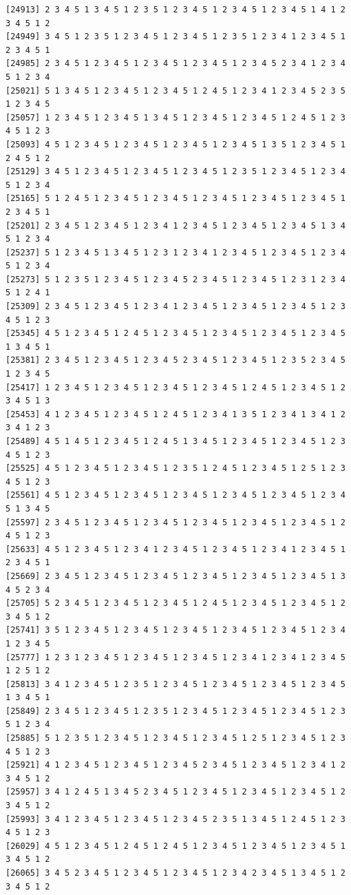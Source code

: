 \documentclass[
  english,
]{book}
\begin{document}
\begin{verbatim}
[24913] 2 3 4 5 1 3 4 5 1 2 3 5 1 2 3 4 5 1 2 3 4 5 1 2 3 4 5 1 4 1 2 3 4 5 1 2
[24949] 3 4 5 1 2 3 5 1 2 3 4 5 1 2 3 4 5 1 2 3 5 1 2 3 4 1 2 3 4 5 1 2 3 4 5 1
[24985] 2 3 4 5 1 2 3 4 5 1 2 3 4 5 1 2 3 4 5 1 2 3 4 5 2 3 4 1 2 3 4 5 1 2 3 4
[25021] 5 1 3 4 5 1 2 3 4 5 1 2 3 4 5 1 2 4 5 1 2 3 4 1 2 3 4 5 2 3 5 1 2 3 4 5
[25057] 1 2 3 4 5 1 2 3 4 5 1 3 4 5 1 2 3 4 5 1 2 3 4 5 1 2 4 5 1 2 3 4 5 1 2 3
[25093] 4 5 1 2 3 4 5 1 2 3 4 5 1 2 3 4 5 1 2 3 4 5 1 3 5 1 2 3 4 5 1 2 4 5 1 2
[25129] 3 4 5 1 2 3 4 5 1 2 3 4 5 1 2 3 4 5 1 2 3 5 1 2 3 4 5 1 2 3 4 5 1 2 3 4
[25165] 5 1 2 4 5 1 2 3 4 5 1 2 3 4 5 1 2 3 4 5 1 2 3 4 5 1 2 3 4 5 1 2 3 4 5 1
[25201] 2 3 4 5 1 2 3 4 5 1 2 3 4 1 2 3 4 5 1 2 3 4 5 1 2 3 4 5 1 3 4 5 1 2 3 4
[25237] 5 1 2 3 4 5 1 3 4 5 1 2 3 1 2 3 4 1 2 3 4 5 1 2 3 4 5 1 2 3 4 5 1 2 3 4
[25273] 5 1 2 3 5 1 2 3 4 5 1 2 3 4 5 2 3 4 5 1 2 3 4 5 1 2 3 1 2 3 4 5 1 2 4 1
[25309] 2 3 4 5 1 2 3 4 5 1 2 3 4 1 2 3 4 5 1 2 3 4 5 1 2 3 4 5 1 2 3 4 5 1 2 3
[25345] 4 5 1 2 3 4 5 1 2 4 5 1 2 3 4 5 1 2 3 4 5 1 2 3 4 5 1 2 3 4 5 1 3 4 5 1
[25381] 2 3 4 5 1 2 3 4 5 1 2 3 4 5 2 3 4 5 1 2 3 4 5 1 2 3 5 2 3 4 5 1 2 3 4 5
[25417] 1 2 3 4 5 1 2 3 4 5 1 2 3 4 5 1 2 3 4 5 1 2 4 5 1 2 3 4 5 1 2 3 4 5 1 3
[25453] 4 1 2 3 4 5 1 2 3 4 5 1 2 4 5 1 2 3 4 1 3 5 1 2 3 4 1 3 4 1 2 3 4 1 2 3
[25489] 4 5 1 4 5 1 2 3 4 5 1 2 4 5 1 3 4 5 1 2 3 4 5 1 2 3 4 5 1 2 3 4 5 1 2 3
[25525] 4 5 1 2 3 4 5 1 2 3 4 5 1 2 3 5 1 2 4 5 1 2 3 4 5 1 2 5 1 2 3 4 5 1 2 3
[25561] 4 5 1 2 3 4 5 1 2 3 4 5 1 2 3 4 5 1 2 3 4 5 1 2 3 4 5 1 2 3 4 5 1 3 4 5
[25597] 2 3 4 5 1 2 3 4 5 1 2 3 4 5 1 2 3 4 5 1 2 3 4 5 1 2 3 4 5 1 2 4 5 1 2 3
[25633] 4 5 1 2 3 4 5 1 2 3 4 1 2 3 4 5 1 2 3 4 5 1 2 3 4 1 2 3 4 5 1 2 3 4 5 1
[25669] 2 3 4 5 1 2 3 4 5 1 2 3 4 5 1 2 3 4 5 1 2 3 4 5 1 2 3 4 5 1 3 4 5 2 3 4
[25705] 5 2 3 4 5 1 2 3 4 5 1 2 3 4 5 1 2 4 5 1 2 3 4 5 1 2 3 4 5 1 2 3 4 5 1 2
[25741] 3 5 1 2 3 4 5 1 2 3 4 5 1 2 3 4 5 1 2 3 4 5 1 2 3 4 5 1 2 3 4 1 2 3 4 5
[25777] 1 2 3 1 2 3 4 5 1 2 3 4 5 1 2 3 4 5 1 2 3 4 1 2 3 4 1 2 3 4 5 1 2 5 1 2
[25813] 3 4 1 2 3 4 5 1 2 3 5 1 2 3 4 5 1 2 3 4 5 1 2 3 4 5 1 2 3 4 5 1 3 4 5 1
[25849] 2 3 4 5 1 2 3 4 5 1 2 3 5 1 2 3 4 5 1 2 3 4 5 1 2 3 4 5 1 2 3 5 1 2 3 4
[25885] 5 1 2 3 5 1 2 3 4 5 1 2 3 4 5 1 2 3 4 5 1 2 5 1 2 3 4 5 1 2 3 4 5 1 2 3
[25921] 4 1 2 3 4 5 1 2 3 4 5 1 2 3 4 5 2 3 4 5 1 2 3 4 5 1 2 3 4 1 2 3 4 5 1 2
[25957] 3 4 1 2 4 5 1 3 4 5 2 3 4 5 1 2 3 4 5 1 2 3 4 5 1 2 3 4 5 1 2 3 4 5 1 2
[25993] 3 4 1 2 3 4 5 1 2 3 4 5 1 2 3 4 5 2 3 5 1 3 4 5 1 2 4 5 1 2 3 4 5 1 2 3
[26029] 4 5 1 2 3 4 5 1 2 4 5 1 2 4 5 1 2 3 4 5 1 2 3 4 5 1 2 3 4 5 1 3 4 5 1 2
[26065] 3 4 5 2 3 4 5 1 2 3 4 5 1 2 3 4 5 1 2 3 4 2 3 4 5 1 3 4 5 1 2 3 4 5 1 2

\end{verbatim}
\end{document}
